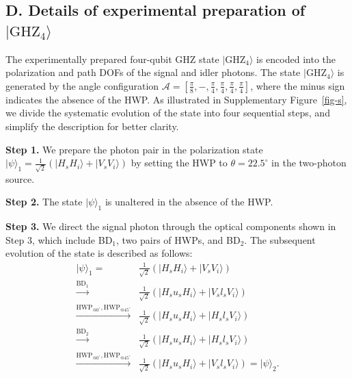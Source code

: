 \documentclass[prl,aps,notitlepage,superscriptaddress,showpacs,nofootinbib]{revtex4-2}
\newcommand{\red}[1]{{\color{red} #1}}
\begin{document}
\subsection{D. Details of experimental preparation of  $|\text{GHZ}_4\rangle$}

The experimentally prepared four-qubit GHZ state $|\text{GHZ}_4\rangle$ is encoded into the polarization and path DOFs of the signal and idler photons. The state $|\text{GHZ}_4\rangle$ is generated by the angle configuration $\mathcal{A}=[\frac{\pi}{8},-,\frac{\pi}{4},\frac{\pi}{4},\frac{\pi}{4},\frac{\pi}{4}]$, where the minus sign indicates the absence of the HWP. As \red{illustrated} in \red{Supplementary}  Figure~\ref{fig-s}, we divide the systematic evolution of the state into four sequential steps, and simplify the description for better clarity.

\textbf{Step 1.} We prepare the photon pair in the polarization state   $|\psi\rangle_1=\frac{1}{\sqrt{2}}(|H_sH_i\rangle+|V_sV_i\rangle)$ by setting the HWP to $\theta=22.5^\circ$ in the two-photon source. 

\textbf{Step 2.} The state $|\psi\rangle_1$ is unaltered in the absence of the HWP.

\textbf{Step 3.} We direct the signal photon through the optical components shown in Step 3, which include BD$_1$, two pairs of HWPs, and BD$_2$. The subsequent evolution of the state is described as follows:
\begin{equation}
	\begin{aligned}
		|\psi\rangle_1=&\frac{1}{\sqrt{2}}(|H_sH_i\rangle+|V_sV_i\rangle)\\
		\xrightarrow{\text{BD$_1$}} &\frac{1}{\sqrt{2}}(|H_su_sH_i\rangle+|V_sl_sV_i\rangle)\\
		\xrightarrow{\text{HWP}_{@0^\circ},\text{HWP}_{@45^\circ}} &\frac{1}{\sqrt{2}}(|H_su_sH_i\rangle+|H_sl_sV_i\rangle)\\
		\xrightarrow{\text{BD$_2$}} &\frac{1}{\sqrt{2}}(|H_su_sH_i\rangle+|H_sl_sV_i\rangle)\\
		\xrightarrow{\text{HWP}_{@0^\circ},\text{HWP}_{@45^\circ}} &\frac{1}{\sqrt{2}}(|H_su_sH_i\rangle+|V_sl_sV_i\rangle)=|\psi\rangle_2.
	\end{aligned}
\end{equation}
\end{document}
